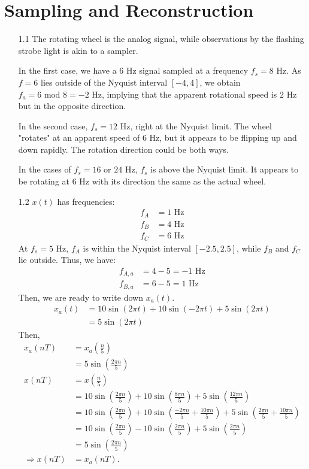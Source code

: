 \section{Sampling and Reconstruction}

\begin{itemize}

\item[1.1]
The rotating wheel is the analog signal, while observations by
the flashing strobe light is akin to a sampler.

In the first case,
we have a $6$ Hz signal sampled at a frequency $f_s = 8$ Hz. As
$f = 6$ lies outside of the Nyquist interval $[-4,4]$, we obtain
$f_a = 6 \text{ mod } 8 = -2$ Hz, implying that the apparent rotational speed
is $2$ Hz but in the opposite direction.

In the second case, $f_s = 12$ Hz, right at the Nyquist limit.
The wheel "rotates" at an apparent speed of $6$ Hz, but it appears
to be flipping up and down rapidly. The rotation direction could be both ways.

In the cases of $f_s = 16$ or $24$ Hz, $f_s$ is above the Nyquist limit.
It appears to be rotating at $6$ Hz with its direction the same
as the actual wheel.

\item[1.2]
$x(t)$ has frequencies:
\begin{align*}
	f_A &= 1 \text{ Hz} \\
	f_B &= 4 \text{ Hz} \\
	f_C &= 6 \text{ Hz}
\end{align*}
At $f_s = 5$ Hz, $f_A$ is within the Nyquist interval $[-2.5,2.5]$, while
$f_B$ and $f_C$ lie outside. Thus, we have:
\begin{align*}
	f_{A,a} &= 4-5 = -1 \text{ Hz} \\
	f_{B,a} &= 6-5 = 1 \text{ Hz}
\end{align*}
Then, we are ready to write down $x_a(t)$.
\begin{align*}
	x_a(t) &= 10\sin(2\pi t) + 10\sin(-2\pi t) + 5\sin(2\pi t) \\
		   &= 5\sin(2\pi t)
\end{align*}
Then,
\begin{align*}
	x_a(nT) &= x_a\left(\frac{n}{5}\right) \\
			&= 5\sin\left(\frac{2\pi n}{5}\right) \\
	x(nT)	&= x\left(\frac{n}{5}\right) \\
			&= 10\sin\left(\frac{2\pi n}{5}\right) + 10\sin\left(\frac{8\pi n}{5}\right) + 5\sin\left(\frac{12\pi n}{5}\right) \\
			&= 10\sin\left(\frac{2\pi n}{5}\right) + 10\sin\left(\frac{-2\pi n}{5}+\frac{10\pi n}{5}\right) + 5\sin\left(\frac{2\pi n}{5}+\frac{10\pi n}{5}\right) \\
			&= 10\sin\left(\frac{2\pi n}{5}\right) - 10\sin\left(\frac{2\pi n}{5}\right) + 5\sin\left(\frac{2\pi n}{5}\right) \\
			&= 5\sin\left(\frac{2\pi n}{5}\right) \\
	\Rightarrow x(nT) &= x_a(nT)\text{.}
\end{align*}


\end{itemize}
